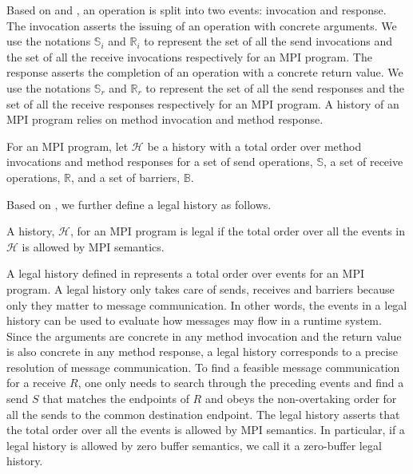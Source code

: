 Based on  and , an operation is split into two events: invocation and response. The invocation asserts the issuing of an operation with concrete arguments. We use the notations $\mathbb{S}_i$ and $\mathbb{R}_i$ to represent the set of all the send invocations and the set of all the receive invocations respectively for an MPI program. The response asserts the completion of an operation with a concrete return value. We use the notations $\mathbb{S}_r$ and $\mathbb{R}_r$ to represent the set of all the send responses and the set of all the receive responses respectively for an MPI program. A history of an MPI program relies on method invocation and method response. 

\begin{definition}[History]\label{def:history}
For an MPI program, let $\mathcal{H}$ be a history with a total order over method invocations and method responses for a set of send operations, $\mathbb{S}$, a set of receive operations, $\mathbb{R}$, and a set of barriers, $\mathbb{B}$.
\end{definition}

Based on , we further define a legal history as follows.

\begin{definition}\label{def:legal}
A history, $\mathcal{H}$, for an MPI program is legal if the total order over all the events in $\mathcal{H}$ is allowed by MPI semantics.
\end{definition}

A legal history defined in  represents a total order over events for an MPI program. A legal history only takes care of sends, receives and barriers because only they matter to message communication. In other words, the events in a legal history can be used to evaluate how messages may flow in a runtime system. Since the arguments are concrete in any method invocation and the return value is also concrete in any method response, a legal history corresponds to a precise resolution of message communication. To find a feasible message communication for a receive $R$, one only needs to search through the preceding events and find a send $S$ that matches the endpoints of $R$ and obeys the non-overtaking order for all the sends to the common destination endpoint. The legal history asserts that the total order over all the events is allowed by MPI semantics. In particular, if a legal history is allowed by zero buffer semantics, we call it a zero-buffer legal history.

